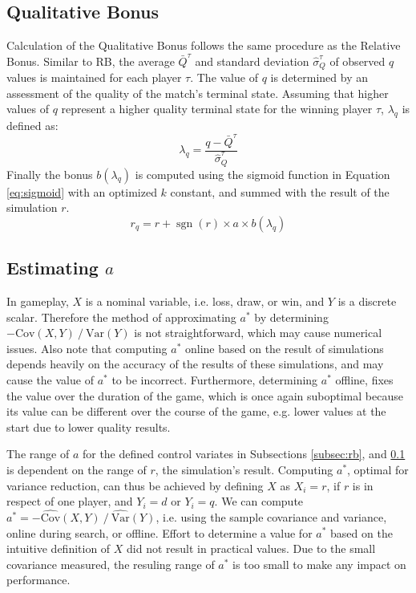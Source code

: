 \documentclass{ecai2014}
\newcommand{\sgn}{\mathop{\mathrm{sgn}}}
\newcommand{\Var}[1]{\mathrm{Var}\left( #1 \right)}
\newcommand{\Cov}[1]{\mathrm{Cov}\left( #1 \right)}
\newcommand{\SVar}[1]{\mathrm{\widehat{Var}}\left( #1 \right)}
\newcommand{\SCov}[1]{\mathrm{\widehat{Cov}}\left( #1 \right)}
\begin{document}
\subsection{Qualitative Bonus}
\label{subsec:qb}
Calculation of the Qualitative Bonus follows the same procedure as the Relative Bonus. Similar to RB, the average $\bar{Q}^\tau$ and standard deviation $\hat{\sigma}^\tau_Q$ of observed $q$ values is maintained for each player $\tau$. The value of $q$ is determined by an assessment of the quality of the match's terminal state. Assuming that higher values of $q$ represent a higher quality terminal state for the winning player $\tau$, $\lambda_q$ is defined as:
\begin{equation}
\lambda_q = \frac{q - \bar{Q}^\tau}{\hat{\sigma}^\tau_Q}
\end{equation}
Finally the bonus $b(\lambda_q)$ is computed using the sigmoid function in Equation \ref{eq:sigmoid} with an optimized $k$ constant, and summed with the result of the simulation $r$.
\begin{equation}
r_q=r+\sgn(r)\times a \times b(\lambda_q)
\end{equation}

\subsection{Estimating $a$}
\label{subsec:astar}

In gameplay, $X$ is a nominal variable, i.e. loss, draw, or win, and $Y$ is a discrete scalar. Therefore the method of approximating $a^*$ by determining $-\Cov{X,Y}\mathbin{/}\Var{Y}$ is not straightforward, which may cause numerical issues. Also note that computing $a^*$ online based on the result of simulations depends heavily on the accuracy of the results of these simulations, and may cause the value of $a^*$ to be incorrect. Furthermore, determining $a^*$ offline, fixes the value over the duration of the game, which is once again suboptimal because its value can be different over the course of the game, e.g. lower values at the start due to lower quality results.

The range of $a$ for the defined control variates in Subsections \ref{subsec:rb}, and \ref{subsec:qb} is dependent on the range of $r$, the simulation's result. Computing $a^*$, optimal for variance reduction, can thus be achieved by defining $X$ as $X_i=r$, if $r$ is in respect of one player, and $Y_i=d$ or $Y_i=q$. We can compute $a^*=-{\SCov{X,Y}}\mathbin{/}{\SVar{Y}}$, i.e. using the sample covariance and variance, online during search, or offline. Effort to determine a value for $a^*$ based on the intuitive definition of $X$ did not result in practical values. Due to the small covariance measured, the resuling range of $a^*$ is too small to make any impact on performance.
\end{document}
